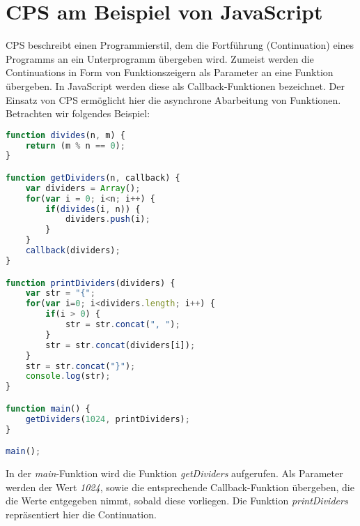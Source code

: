 \section{\acf{CPS} am Beispiel von JavaScript}
\acf{CPS} beschreibt einen Programmierstil, dem die Fortführung (Continuation) eines Programms an ein Unterprogramm übergeben wird. Zumeist werden die Continuations in Form von Funktionszeigern als Parameter an eine Funktion übergeben. In JavaScript werden diese als Callback-Funktionen bezeichnet. Der Einsatz von \acs{CPS} ermöglicht hier die asynchrone Abarbeitung von Funktionen. Betrachten wir folgendes Beispiel:\\
\begin{lstlisting}[language=JavaScript,caption=JavaScript Callback Beispiel,label=lstjscallback]
function divides(n, m) {
	return (m % n == 0);
}

function getDividers(n, callback) {
	var dividers = Array();
	for(var i = 0; i<n; i++) {
		if(divides(i, n)) {
			dividers.push(i);
		}
	}
	callback(dividers);	
}

function printDividers(dividers) {
	var str = "{";
	for(var i=0; i<dividers.length; i++) {
		if(i > 0) {
			str = str.concat(", ");
		}
		str = str.concat(dividers[i]);
	}
	str = str.concat("}");
	console.log(str);
}

function main() {
	getDividers(1024, printDividers);
}

main();
\end{lstlisting}
In der \textit{main}-Funktion wird die Funktion \textit{getDividers} aufgerufen. Als Parameter werden der Wert \textit{1024}, sowie die entsprechende Callback-Funktion übergeben, die die Werte entgegeben nimmt, sobald diese vorliegen. Die Funktion \textit{printDividers} repräsentiert hier die Continuation.
\acresetall
